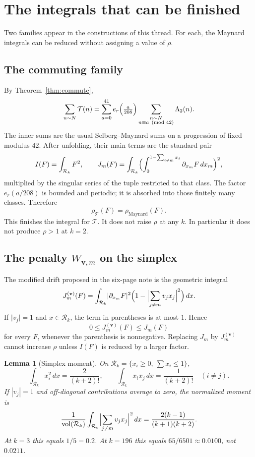 \documentclass[11pt,a4paper]{article}
\theoremstyle{plain}
\newtheorem{lemma}{Lemma}
\theoremstyle{definition}
\theoremstyle{plain}
\numberwithin{equation}{section}
\begin{document}
\section{The integrals that can be finished}
\label{sec:integrals}

Two families appear in the constructions of this thread. For each, the Maynard integrals can be reduced without assigning a value of \(\rho\).

\subsection{The commuting family}
By Theorem~\ref{thm:commute},
\[
\sum_{n\sim N}\mathcal{T}(n)
=\sum_{a=0}^{41}e_r\Bigl(\tfrac{a}{208}\Bigr)
\sum_{\substack{n\sim N\\ n\equiv a\pmod{42}}}\Lambda_2(n).
\]
The inner sums are the usual Selberg--Maynard sums on a progression of fixed modulus \(42\). After unfolding, their main terms are the standard pair
\[
I(F)=\int_{\mathcal{R}_k}F^2,\qquad
J_m(F)=\int_{\mathcal{R}_k}\Bigl(\int_0^{1-\sum_{i\neq m}x_i}\partial_{x_m}F\,dx_m\Bigr)^2,
\]
multiplied by the singular series of the tuple restricted to that class. The factor \(e_r(a/208)\) is bounded and periodic; it is absorbed into those finitely many classes. Therefore
\[
\rho_{\mathcal{T}}(F)=\rho_{\mathrm{Maynard}}(F).
\]
This finishes the integral for \(\mathcal{T}\). It does not raise \(\rho\) at any \(k\). In particular it does not produce \(\rho>1\) at \(k=2\).

\subsection{The penalty \(W_{\mathbf{v},m}\) on the simplex}
The modified drift proposed in the six-page note is the geometric integral
\begin{equation}
\label{eq:Jv}
J_m^{(\mathbf{v})}(F)
=\int_{\mathcal{R}_k}\lvert\partial_{x_m}F\rvert^2
\Bigl(1-\Bigl\lvert\sum_{j\neq m}v_j x_j\Bigr\rvert^2\Bigr)\,dx.
\end{equation}
If \(\lvert v_j\rvert=1\) and \(x\in\mathcal{R}_k\), the term in parentheses is at most \(1\). Hence
\[
0\le J_m^{(\mathbf{v})}(F)\le J_m(F)
\]
for every \(F\), whenever the parenthesis is nonnegative. Replacing \(J_m\) by \(J_m^{(\mathbf{v})}\) cannot increase \(\rho\) unless \(I(F)\) is reduced by a larger factor.

\begin{lemma}[Simplex moment]
\label{lem:simplex}
On \(\mathcal{R}_k=\{x_i\ge 0,\ \sum x_i\le 1\}\),
\[
\int_{\mathcal{R}_k}x_i^2\,dx=\frac{2}{(k+2)!},\qquad
\int_{\mathcal{R}_k}x_i x_j\,dx=\frac{1}{(k+2)!}\quad(i\neq j).
\]
If \(|v_j|=1\) and off-diagonal contributions average to zero, the normalized moment is
\[
\frac{1}{\mathrm{vol}(\mathcal{R}_k)}\int_{\mathcal{R}_k}\Bigl|\sum_{j\neq m}v_j x_j\Bigr|^2\,dx
=\frac{2(k-1)}{(k+1)(k+2)}.
\]
At \(k=3\) this equals \(1/5=0.2\). At \(k=196\) this equals \(65/6501\approx 0.0100\), not \(0.0211\).
\end{lemma}
\end{document}
